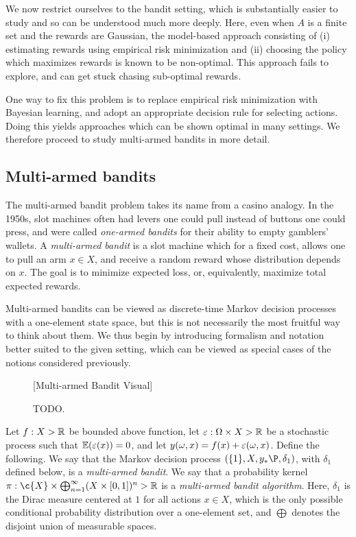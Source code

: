 \documentclass[11pt]{book}
\begin{document}
We now restrict ourselves to the bandit setting, which is substantially easier to study and so can be understood much more deeply.
Here, even when $A$ is a finite set and the rewards are Gaussian, the model-based approach consisting of (i) estimating rewards using empirical risk minimization and (ii) choosing the policy which maximizes rewards is known to be non-optimal.
This approach fails to explore, and can get stuck chasing sub-optimal rewards.

One way to fix this problem is to replace empirical risk minimization with Bayesian learning, and adopt an appropriate decision rule for selecting actions.
Doing this yields approaches which can be shown optimal in many settings.
We therefore proceed to study multi-armed bandits in more detail.

\subsection{Multi-armed bandits}

The multi-armed bandit problem takes its name from a casino analogy.
In the 1950s, slot machines often had levers one could pull instead of buttons one could press, and were called \emph{one-armed bandits} for their ability to empty gamblers' wallets.
A \emph{multi-armed bandit} is a slot machine which for a fixed cost, allows one to pull an arm $x \in X$, and receive a random reward whose distribution depends on $x$.
The goal is to minimize  expected loss, or, equivalently, maximize total expected rewards.

Multi-armed bandits can be viewed as discrete-time Markov decision processes with a one-element state space, but this is not necessarily the most fruitful way to think about them.
We thus begin by introducing formalism and notation better suited to the given setting, which can be viewed as special cases of the notions considered previously.

\begin{figure*}[t]
\vspace*{10ex}
[Multi-armed Bandit Visual]
\vspace*{10ex}
\caption{TODO.}
\end{figure*}

\begin{definition}
Let $f : X \-> \mathbb{R}$ be bounded above function, let $\varepsilon : \Omega \times X \-> \mathbb{R}$ be a stochastic process such that $\operatorname{\mathbb{E}}(\varepsilon(x)) = 0$, and let $y(\omega,x) = f(x) + \varepsilon(\omega,x)$.
Define the following.
\1 We say that the Markov decision process $(\{1\},X,y_*\P,\delta_{1})$, with $\delta_1$ defined below, is a \emph{multi-armed bandit}.
\2 We say that a probability kernel  $\pi : \c{X} \x \bigoplus_{n=1}^\infty (X \x [0,1])^n \-> \R$ is a \emph{multi-armed bandit algorithm}.
\0
Here, $\delta_1$ is the Dirac measure centered at $1$ for all actions $x\in X$, which is the only possible conditional probability distribution over a one-element set, and $\bigoplus$ denotes the disjoint union of measurable spaces.
\end{definition}
\end{document}
